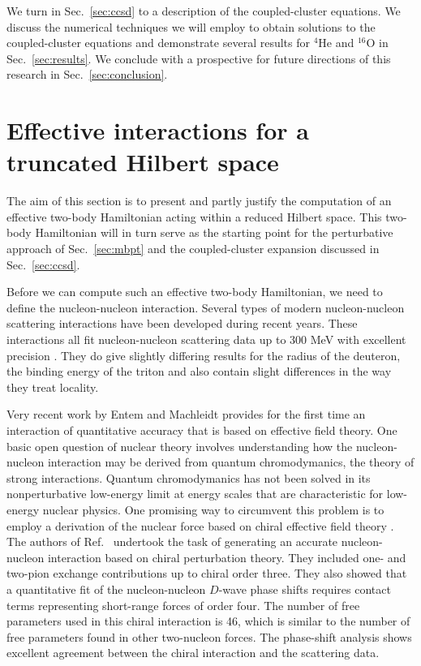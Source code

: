 We turn in Sec.~\ref{sec:ccsd}  to a 
description of the coupled-cluster equations. 
We discuss the numerical techniques
we will employ to obtain solutions to the coupled-cluster
equations and demonstrate several results 
for $^{4}$He and $^{16}$O in Sec.~\ref{sec:results}.
We conclude with a prospective for future directions of this research
in Sec.~\ref{sec:conclusion}. 

\section{Effective interactions for a truncated Hilbert space}
\label{sec:gmatrix}
The aim of this section is to present and partly justify the computation of 
an effective two-body Hamiltonian acting within a reduced Hilbert space.
This two-body Hamiltonian will in turn serve as the starting point for the
perturbative approach of Sec.~\ref{sec:mbpt} and the 
coupled-cluster expansion discussed in Sec.~\ref{sec:ccsd}.

Before we can compute such an effective two-body Hamiltonian,
we need to define the nucleon-nucleon interaction.    
Several types of modern nucleon-nucleon scattering interactions
have been developed during recent years. These interactions all 
fit nucleon-nucleon scattering data up to 300 MeV with excellent
precision \cite{cdbonn,bob95,stoks94}. They do give slightly differing
results for the radius of the deuteron, the binding energy of the triton
and also contain slight differences in the way they treat locality. 

Very recent work by Entem and Machleidt \cite{machleidt02}
provides for the first time an interaction of quantitative accuracy
that is based on effective field theory. One basic open question of 
nuclear theory involves understanding how the nucleon-nucleon interaction
may be derived from quantum chromodymanics, 
the theory of strong interactions. Quantum chromodymanics has
not been solved in its nonperturbative low-energy limit at energy scales
that are characteristic for low-energy nuclear physics. One promising
way to circumvent this problem is to employ a derivation of the nuclear
force based on chiral effective field theory 
\cite{weinberg,vankolck}. The authors of Ref.~\cite{machleidt02} 
undertook the task of generating an accurate
nucleon-nucleon interaction  based on chiral perturbation theory. They
included one- and two-pion exchange contributions up to 
chiral order three. They also showed that a quantitative fit of the 
nucleon-nucleon $D$-wave phase shifts requires contact terms representing
short-range forces of order four. The number of free parameters used in
this chiral interaction is 46, which is similar to the number of free
parameters found in other two-nucleon forces. The phase-shift analysis
shows excellent agreement between the chiral interaction and the scattering
data. 

